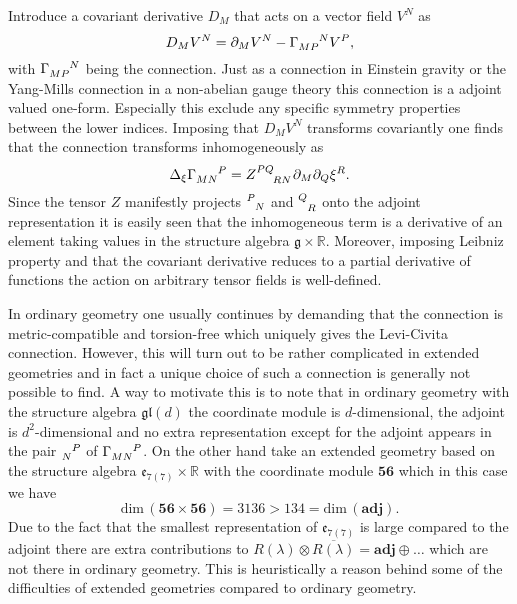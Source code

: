 Introduce a covariant derivative $D_M$ that acts on a vector field $V^N$ as  
\begin{equation}
    D_MV^N = \pd_M V^N-\tensor{\Gamma}{_{MP}^N}V^P,
\end{equation}
with $\tensor{\Gamma}{_{MP}^N}$ being the connection. Just as a connection in Einstein gravity or the Yang-Mills connection in a non-abelian gauge theory this connection is a adjoint valued one-form. Especially this exclude any specific symmetry properties between the lower indices. Imposing that $D_MV^N$ transforms covariantly one finds that the connection transforms inhomogeneously as 
\begin{equation}\label{eq:InHomoConnection}
    \Delta_\xi \tensor{\Gamma}{_{MN}^P} = \tensor{Z}{^{PQ}_{RN}}\pd_M\pd_Q\xi^R. 
\end{equation}
Since the tensor $Z$ manifestly projects $\tensor{}{^P_N}$ and $\tensor{}{^Q_R}$ onto the adjoint representation it is easily seen that the inhomogeneous term is a derivative of an element taking values in the structure algebra $\mathfrak{g}\times\mathbb{R}$. Moreover, imposing Leibniz property and that the covariant derivative reduces to a partial derivative of functions the action on arbitrary tensor fields is well-defined. 

In ordinary geometry one usually continues by demanding that the connection is metric-compatible and torsion-free which uniquely gives the Levi-Civita connection. However, this will turn out to be rather complicated in extended geometries and in fact a unique choice of such a connection is generally not possible to find. A way to motivate this is to note that in ordinary geometry with the structure algebra $\mathfrak{gl}(d)$ the coordinate module is $d$-dimensional, the adjoint is $d^2$-dimensional and no extra representation except for the adjoint appears in the pair $\tensor{}{_N^P}$ of $\tensor{\Gamma}{_{MN}^P}$. On the other hand take an extended geometry based on the structure algebra $\mathfrak{e}_{7(7)}\times\mathbb{R}$ with the coordinate module $\mathbf{56}$ which in this case we have
\begin{equation}
    \text{dim}\, (\mathbf{56}\times\mathbf{56}) = 3136 > 134 = \text{dim}\, (\mathbf{adj}).
\end{equation}
Due to the fact that the smallest representation of $\mathfrak{e}_{7(7)}$ is large compared to the adjoint there are extra contributions to $R(\lambda)\otimes\overbar{R(\lambda)}=\mathbf{adj}\oplus\ldots$ which are not there in ordinary geometry. This is heuristically a reason behind some of the difficulties of extended geometries compared to ordinary geometry. 

